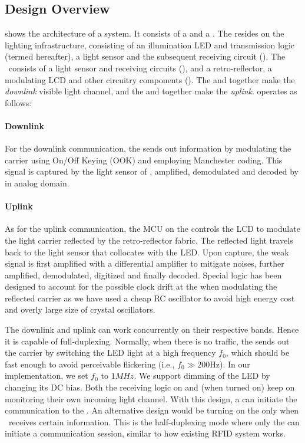 \subsection{Design Overview}
 shows the architecture of a \retro system. It consists of a \reader and a \vitag. The \reader resides on the lighting infrastructure, consisting of an illumination LED and transmission logic (termed \readertx hereafter), a light sensor and the subsequent receiving circuit (\readerrx). The \vitag\ consists of a light sensor and receiving circuits (\tagrx), and a retro-reflector, a modulating LCD and other circuitry components (\tagtx).  The \readertx and \tagrx together make the \textit{downlink} visible light channel, and the \tagtx and \readerrx together make the \textit{uplink}. 
\retro operates as follows: 

\paragraph{Downlink} 
For the downlink communication, the \reader sends out information by modulating the carrier using On/Off Keying (OOK) and employing Manchester coding. This signal is captured by the light sensor of \vitag, amplified, demodulated and decoded by \tagrx in analog domain.

\paragraph{Uplink} 
As for the uplink communication, the MCU on the \vitag controls the LCD to modulate the light carrier reflected by the retro-reflector fabric. The reflected light travels back to the light sensor that collocates with the LED. Upon capture, the weak signal is first amplified with a differential amplifier to mitigate noises, further amplified, demodulated, digitized and finally decoded. Special logic has been designed to account for the possible clock drift at the \vitag when modulating the reflected carrier as we have used a cheap RC oscillator to avoid high energy cost and overly large size of crystal oscillators. 

The downlink and uplink can work concurrently on their respective bands. Hence it is capable of full-duplexing. 
Normally, when there is no traffic, the \readertx sends out the carrier by switching the LED light at a high frequency $f_0$, which should be fast enough to avoid perceivable flickering (i.e., $f_0 \gg 200$Hz). In our implementation, we set $f_0$ to $1MHz$. We support dimming of the LED by changing its DC bias. Both the receiving logic on \reader and \vitag (when turned on) keep on monitoring their own incoming light channel. With this design, a \vitag can initiate the communication to the \reader. An alternative design would be turning on the \tagtx only when \vitag\ receives certain information. This is the half-duplexing mode where only the \reader can initiate a communication session, similar to how existing RFID system works.


